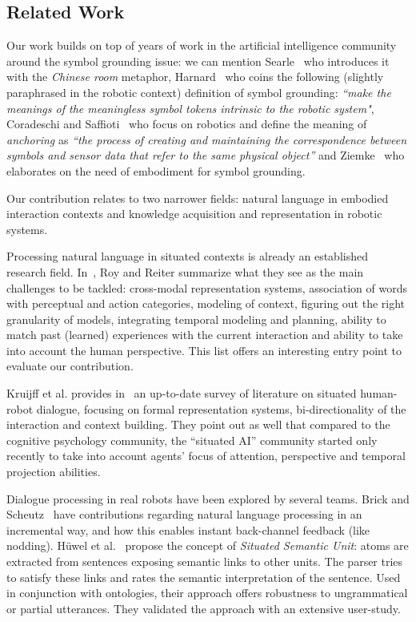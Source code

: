 \documentclass{svmult}
\begin{document}
\subsection{Related Work}

Our work builds on top of years of work in the artificial intelligence
community around the symbol grounding issue: we can mention
Searle~\cite{Searle1980} who introduces it with the \emph{Chinese room}
metaphor, Harnard~\cite{Harnad1990} who coins the following (slightly
paraphrased in the robotic context) definition of symbol grounding:
\emph{``make the meanings of the meaningless symbol tokens intrinsic to the
robotic system"}, Coradeschi and Saffioti~\cite{Coradeschi2003} who focus on
robotics and define the meaning of \emph{anchoring} as \emph{``the process of
creating and maintaining the correspondence between symbols and sensor data
that refer to the same physical object''} and Ziemke~\cite{Ziemke1999} who
elaborates on the need of embodiment for symbol grounding.

Our contribution relates to two narrower fields: natural language in embodied
interaction contexts and knowledge acquisition and representation in robotic
systems.

Processing natural language in situated contexts is already an established
research field. In~\cite{Roy2005}, Roy and Reiter summarize what they see as
the main challenges to be tackled: cross-modal representation systems,
association of words with perceptual and action categories, modeling of
context, figuring out the right granularity of models, integrating temporal
modeling and planning, ability to match past (learned) experiences with the
current interaction and ability to take into account the human perspective.
This list offers an interesting entry point to evaluate our contribution.

Kruijff et al. provides in~\cite{Kruijff2010} an up-to-date survey of
literature on situated human-robot dialogue, focusing on formal representation
systems, bi-directionality of the interaction and context building. They point
out as well that compared to the cognitive psychology community, the ``situated
AI'' community started only recently to take into account agents' focus of
attention, perspective and temporal projection abilities.

Dialogue processing in real robots have been explored by several teams.  Brick
and Scheutz~\cite{Brick2007} have contributions regarding natural language
processing in an incremental way, and how this enables instant back-channel
feedback (like nodding). Hüwel et al.~\cite{Huwel2006} propose the concept of
\textit{Situated Semantic Unit}: atoms are extracted from sentences exposing
semantic links to other units. The parser tries to satisfy these links and
rates the semantic interpretation of the sentence. Used in conjunction with
ontologies, their approach offers robustness to ungrammatical or partial
utterances. They validated the approach with an extensive user-study.
\end{document}

